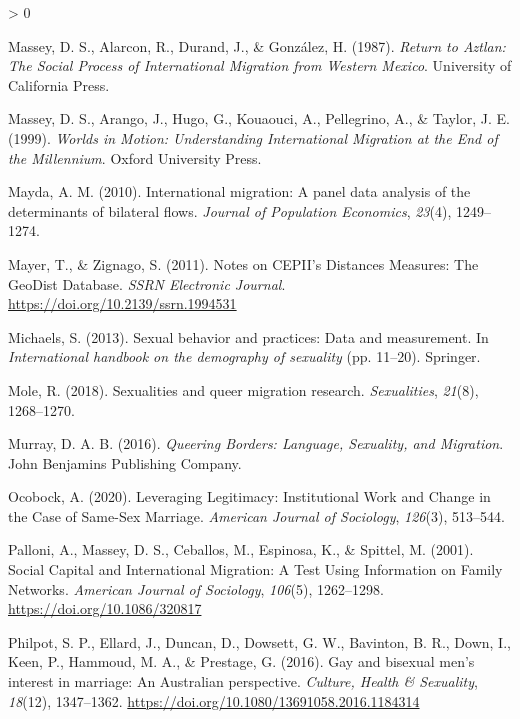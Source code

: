 \documentclass[
  12pt,
]{article}
\newlength{\cslhangindent}
\newenvironment{CSLReferences}[2] %
 {%
  \setlength{\parindent}{0pt}
  \ifodd #1 \everypar{\setlength{\hangindent}{\cslhangindent}}\ignorespaces\fi
  \ifnum #2 > 0
  \setlength{\parskip}{#2\baselineskip}
  \fi
 }%
 {}
\begin{document}
\begin{CSLReferences}{1}{0}
\leavevmode\hypertarget{ref-massey_1987}{}%
Massey, D. S., Alarcon, R., Durand, J., \& González, H. (1987). \emph{Return to {Aztlan}: The {Social Process} of {International Migration} from {Western Mexico}}. {University of California Press}.

\leavevmode\hypertarget{ref-massey_1999}{}%
Massey, D. S., Arango, J., Hugo, G., Kouaouci, A., Pellegrino, A., \& Taylor, J. E. (1999). \emph{Worlds in {Motion}: Understanding {International Migration} at the {End} of the {Millennium}}. {Oxford University Press}.

\leavevmode\hypertarget{ref-mayda_2010}{}%
Mayda, A. M. (2010). International migration: A panel data analysis of the determinants of bilateral flows. \emph{Journal of Population Economics}, \emph{23}(4), 1249--1274.

\leavevmode\hypertarget{ref-mayer_2011}{}%
Mayer, T., \& Zignago, S. (2011). Notes on {CEPII}'s {Distances Measures}: The {GeoDist Database}. \emph{SSRN Electronic Journal}. \url{https://doi.org/10.2139/ssrn.1994531}

\leavevmode\hypertarget{ref-michaels_2013}{}%
Michaels, S. (2013). Sexual behavior and practices: Data and measurement. In \emph{International handbook on the demography of sexuality} (pp. 11--20). {Springer}.

\leavevmode\hypertarget{ref-mole_2018a}{}%
Mole, R. (2018). Sexualities and queer migration research. \emph{Sexualities}, \emph{21}(8), 1268--1270.

\leavevmode\hypertarget{ref-murray_2016}{}%
Murray, D. A. B. (2016). \emph{Queering {Borders}: Language, {Sexuality}, and {Migration}}. {John Benjamins Publishing Company}.

\leavevmode\hypertarget{ref-ocobock_2020_leveraging}{}%
Ocobock, A. (2020). Leveraging {Legitimacy}: Institutional {Work} and {Change} in the {Case} of {Same}-{Sex Marriage}. \emph{American Journal of Sociology}, \emph{126}(3), 513--544.

\leavevmode\hypertarget{ref-palloni_2001}{}%
Palloni, A., Massey, D. S., Ceballos, M., Espinosa, K., \& Spittel, M. (2001). Social {Capital} and {International Migration}: A {Test Using Information} on {Family Networks}. \emph{American Journal of Sociology}, \emph{106}(5), 1262--1298. \url{https://doi.org/10.1086/320817}

\leavevmode\hypertarget{ref-philpot_2016_gay}{}%
Philpot, S. P., Ellard, J., Duncan, D., Dowsett, G. W., Bavinton, B. R., Down, I., Keen, P., Hammoud, M. A., \& Prestage, G. (2016). Gay and bisexual men's interest in marriage: An {Australian} perspective. \emph{Culture, Health \& Sexuality}, \emph{18}(12), 1347--1362. \url{https://doi.org/10.1080/13691058.2016.1184314}


\end{CSLReferences}
\end{document}
